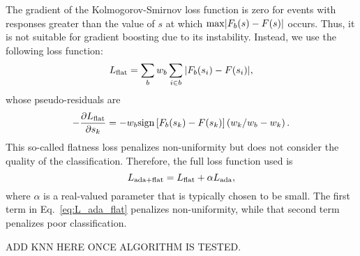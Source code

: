 The gradient of the Kolmogorov-Smirnov loss function is zero for events with responses greater than the value of $s$ at which ${\rm max}|F_b(s)-F(s)|$ occurs.  Thus, it is not suitable for gradient boosting due to its instability.  Instead, we use the following loss function:
\begin{equation}
  L_{\rm flat} = \sum\limits_{b} w_b \sum\limits_{i \in b}|F_b(s_i)-F(s_i)|,
\end{equation}
whose pseudo-residuals are
\begin{equation}
 -\frac{\partial L_{\rm flat}}{\partial s_k} = - w_b {\rm sign}\left[F_b(s_k)-F(s_k)\right] \left( w_k/w_b - w_k \right).  
\end{equation}
This so-called flatness loss penalizes non-uniformity but does not consider the quality of the classification.  Therefore, the full loss function used is 
\begin{equation}
\label{eq:L_ada_flat}
  L_{{\rm ada}+{\rm flat}} = L_{\rm flat} + \alpha L_{\rm ada},
\end{equation}  
where $\alpha$ is a real-valued parameter that is typically chosen to be small.  The first term in Eq.~\ref{eq:L_ada_flat} penalizes non-uniformity, while that second term penalizes poor classification.  

ADD KNN HERE ONCE ALGORITHM IS TESTED.
